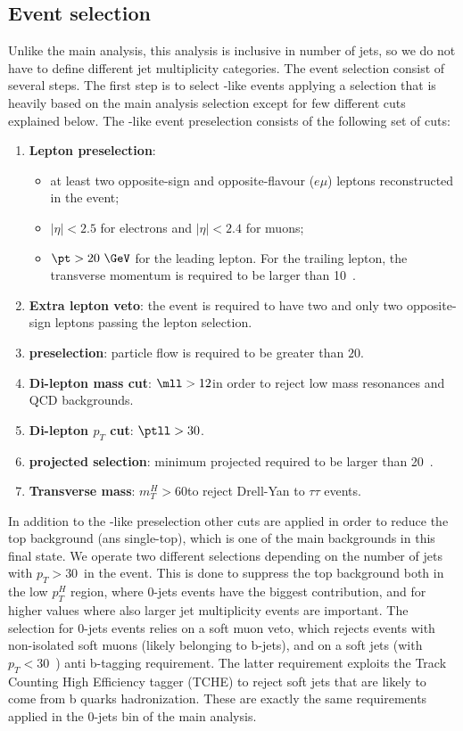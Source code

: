 	\subsection{Event selection\label{subsec:EventSelection}}
Unlike the main \hwwllnn analysis, this analysis is inclusive in number of jets, so we do not have to define different jet multiplicity categories.
The event selection consist of several steps. The first step is to select \WW -like events applying a selection that is heavily based on the main analysis selection except for few different cuts explained below.
The \WW -like event preselection consists of the following set of cuts:
\begin{enumerate}
\item {\bf Lepton preselection}:
  \begin{itemize}
  \item at least two opposite-sign and opposite-flavour ($e\mu$) leptons reconstructed in the event;
  \item $|\eta|<2.5$ for electrons and $|\eta|<2.4$ for muons;
  \item $\pt>20~\GeV$ for the leading lepton. For the trailing lepton, the transverse momentum is required to be larger than 10~\GeV.
  \end{itemize}
\item {\bf Extra lepton veto}: the event is required to have two and only two opposite-sign leptons passing the lepton selection.
\item {\bf \MET preselection}: particle flow \MET is required to be greater than $20$\GeV.
\item {\bf Di-lepton mass cut}: $\mll > 12$\GeV in order to reject low mass resonances and QCD backgrounds.
\item {\bf Di-lepton $p_T$ cut}: $\ptll > 30$\GeV.
\item {\bf projected \MET selection}: minimum projected \MET required to be larger than 20~\GeV.
\item {\bf Transverse mass}: $m_T^H>60$\GeV to reject Drell-Yan to $\tau\tau$ events. 
\end{enumerate}
In addition to the \WW-like preselection other cuts are applied in order to reduce the top background (\ttbar ans single-top), which is one of the main backgrounds in this final state. We operate two different selections depending on the number of jets with $p_T > 30$~\GeV in the event. This is done to suppress the top background both in the low $p_T^H$ region, where 0-jets events have the biggest contribution, and for higher values where also larger jet multiplicity events are important.
The selection for 0-jets events relies on a soft muon veto, which rejects events with non-isolated soft muons (likely belonging to b-jets), and on a soft jets (with $p_T < 30$~\GeV) anti b-tagging requirement.
The latter requirement exploits the Track Counting High Efficiency tagger (TCHE) to reject soft jets that are likely to come from b quarks hadronization.
These are exactly the same requirements applied in the 0-jets bin of the main analysis.

